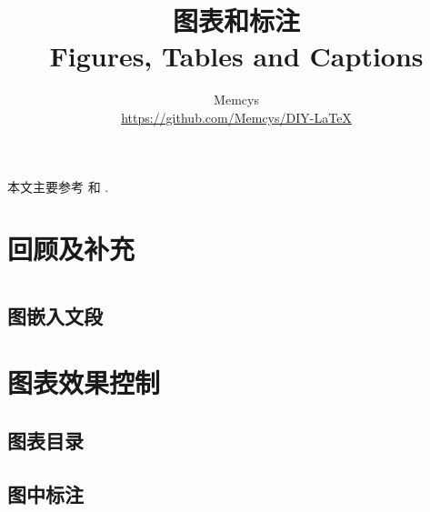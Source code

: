 \documentclass[]{ctexart}
\title{图表和标注 \\ Figures, Tables and Captions}
\author{Memcys \\ \url{https://github.com/Memcys/DIY-LaTeX}}
\date{\zhdate{2019/11/17}}
\begin{document}
\maketitle

本文主要参考 \cite{wiki:floats} 和 \cite{wiki:tables}.

\setcounter{section}{-1}
\section{回顾及补充}


\tableofcontents

\section[图]{}


\subsection{图嵌入文段}


\section[表格]{}


\section[标注]{}


\section{图表效果控制}
\subsection{图表目录}


\subsection[子浮动体]{}\label{sec:subfloats}


\subsection{图中标注}

\end{document}
